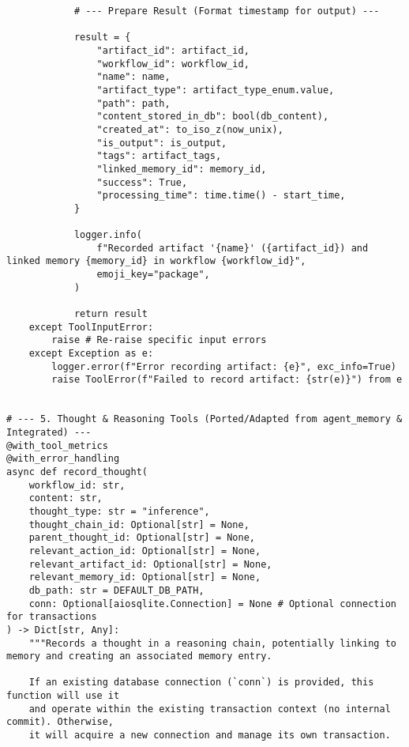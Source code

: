\documentclass[12pt,a4paper]{article}
\begin{document}
\begin{pageablecode}
\begin{verbatim}
            # --- Prepare Result (Format timestamp for output) ---

            result = {
                "artifact_id": artifact_id,
                "workflow_id": workflow_id,
                "name": name,
                "artifact_type": artifact_type_enum.value,
                "path": path,
                "content_stored_in_db": bool(db_content),
                "created_at": to_iso_z(now_unix),
                "is_output": is_output,
                "tags": artifact_tags,
                "linked_memory_id": memory_id,
                "success": True,
                "processing_time": time.time() - start_time,
            }

            logger.info(
                f"Recorded artifact '{name}' ({artifact_id}) and linked memory {memory_id} in workflow {workflow_id}",
                emoji_key="package",
            )

            return result
    except ToolInputError:
        raise # Re-raise specific input errors
    except Exception as e:
        logger.error(f"Error recording artifact: {e}", exc_info=True)
        raise ToolError(f"Failed to record artifact: {str(e)}") from e
    

# --- 5. Thought & Reasoning Tools (Ported/Adapted from agent_memory & Integrated) ---
@with_tool_metrics
@with_error_handling
async def record_thought(
    workflow_id: str,
    content: str,
    thought_type: str = "inference",
    thought_chain_id: Optional[str] = None,
    parent_thought_id: Optional[str] = None,
    relevant_action_id: Optional[str] = None,
    relevant_artifact_id: Optional[str] = None,
    relevant_memory_id: Optional[str] = None,
    db_path: str = DEFAULT_DB_PATH,
    conn: Optional[aiosqlite.Connection] = None # Optional connection for transactions
) -> Dict[str, Any]:
    """Records a thought in a reasoning chain, potentially linking to memory and creating an associated memory entry.

    If an existing database connection (`conn`) is provided, this function will use it
    and operate within the existing transaction context (no internal commit). Otherwise,
    it will acquire a new connection and manage its own transaction.


\end{verbatim}
\end{pageablecode}
\end{document}
